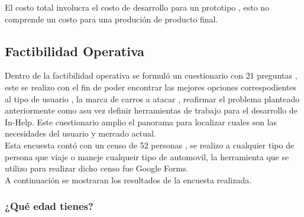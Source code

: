 El costo total involucra el costo de desarrollo para un prototipo , esto no comprende un costo para una produción de producto final.\\
%  
\subsection{Factibilidad Operativa}

Dentro de la factibilidad operativa se formuló un cuestionario con 21 preguntas , este se realizo con el fin de poder encontrar las mejores opciones correspodientes al tipo de usuario , la marca de carros a atacar , reafirmar el problema planteado anteriormente como asu vez definir herramientas de trabajo para el desarrollo de In-Help. Este cuestionario amplio el panorama para localizar cuales son las necesidades del usuario y mercado actual. \\
Esta encuesta contó con un censo de 52 personas , se realizo a cualquier tipo de persona que viaje o maneje cualqueir tipo de automovil, la herramienta que se utilizo para realizar dicho censo fue Google Forms. \\
A continuación se mostraran los resultados de la encuesta realizada.
\subsubsection{¿Qué edad tienes?}

